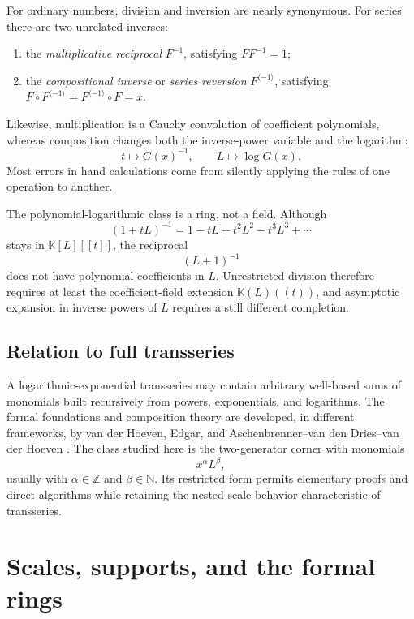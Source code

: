 \documentclass[11pt]{article}
\theoremstyle{pltheorem}
\newcommand{\K}{\mathbb K}
\newcommand{\N}{\mathbb N}
\newcommand{\Z}{\mathbb Z}
\newcommand{\rev}{\langle-1\rangle}
\newcommand{\compose}{\mathbin{\circ}}
\begin{document}
For ordinary numbers, division and inversion are nearly synonymous.  For series there are two unrelated inverses:
\begin{enumerate}[label=\textup{(\roman*)}]
\item the \emph{multiplicative reciprocal} \(F^{-1}\), satisfying \(F F^{-1}=1\);
\item the \emph{compositional inverse} or \emph{series reversion} \(F^{\rev}\), satisfying
\(F\compose F^{\rev}=F^{\rev}\compose F=x\).
\end{enumerate}
Likewise, multiplication is a Cauchy convolution of coefficient polynomials, whereas composition changes both the inverse-power variable and the logarithm:
\[
 t\mapsto G(x)^{-1},\qquad L\mapsto\log G(x).
\]
Most errors in hand calculations come from silently applying the rules of one operation to another.

\begin{warningbox}
The polynomial-logarithmic class is a ring, not a field.  Although
\[
 (1+tL)^{-1}=1-tL+t^2L^2-t^3L^3+\cdots
\]
stays in \(\K[L][[t]]\), the reciprocal
\[
 (L+1)^{-1}
\]
does not have polynomial coefficients in \(L\).  Unrestricted division therefore requires at least the coefficient-field extension \(\K(L)((t))\), and asymptotic expansion in inverse powers of \(L\) requires a still different completion.
\end{warningbox}

\subsection{Relation to full transseries}

A logarithmic-exponential transseries may contain arbitrary well-based sums of monomials built recursively from powers, exponentials, and logarithms.  The formal foundations and composition theory are developed, in different frameworks, by van der Hoeven, Edgar, and Aschenbrenner--van den Dries--van der Hoeven \cite{vanderhoeven-book,edgar-beginners,edgar-composition,adh-book}.  The class studied here is the two-generator corner with monomials
\begin{equation}\label{eq:power-log-monomials}
 x^\alpha L^\beta,
\end{equation}
usually with \(\alpha\in\Z\) and \(\beta\in\N\).  Its restricted form permits elementary proofs and direct algorithms while retaining the nested-scale behavior characteristic of transseries.

\section{Scales, supports, and the formal rings}
\label{sec:formal-rings}
\end{document}

